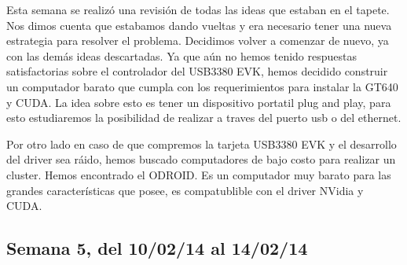 \documentclass[11pt,oneside,titlepage]{article}
\begin{document}
Esta semana se realizó una revisión de todas las ideas que estaban en el
tapete. Nos dimos cuenta que estabamos dando vueltas y era necesario tener una
nueva estrategia para resolver el problema. Decidimos volver a comenzar de
nuevo, ya con las demás ideas descartadas. Ya que aún no hemos tenido
respuestas satisfactorias sobre el controlador del USB3380 EVK, hemos decidido
construir un computador barato que cumpla con los requerimientos para instalar
la GT640 y CUDA. La idea sobre esto es tener un dispositivo portatil plug and
play, para esto estudiaremos la posibilidad de realizar a traves del puerto usb
o del ethernet. 

Por otro lado en caso de que compremos la tarjeta USB3380 EVK y el desarrollo
del driver sea ráido, hemos buscado computadores de bajo costo para realizar un
cluster. Hemos encontrado el ODROID. Es un computador muy barato para las
grandes características que posee, es compatublible con el driver NVidia y
CUDA.

\subsection*{Semana 5, del 10/02/14 al 14/02/14}
\begin{comment}
lunes
- Ademas se realizó un estudio sobre como conectar el comptuador de una forma
plug and play, las opciones son utilizar el puerto Ethernet o, mejor aún,
realizar la conexión a trav\'es USB.

martes 
- Reunion con el profesor para ver el estado del proyecto. 3 ideas
  nuevas aparecieron.

miercoles 
- Contacto con un desarrollador de USB3380 para solicitar ayuda en el
  campo. 
- Estudio de RNDIS para conectar usb a usb, existe la posibilidad.

jueves 
- Estudio del funcionamiento de usb. Aprendi que podemos utilizar el
  computador como gadget y realizar la configuración recompilando el kernel y
  agregando los drivers.Mas detalles leer Linux Gadget Drivers
- Aún falta el cable. 
- Compilación del kernel para agregar los módulos. Estamos a la espera
  del cable USB macho macho.

viernes 
- Update del proyecto al profesor Claudio torres. 
 - compramos cable USB 3.0, estamos a la espera del envío.
\end{comment}
\end{document}
